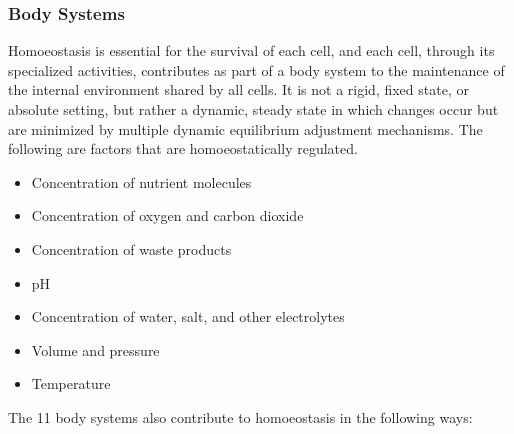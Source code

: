 \documentclass[11pt]{article}
\begin{document}
\subsubsection{Body Systems}
Homoeostasis is essential for the survival of each cell, and each cell, through its specialized activities, contributes as part of a body system to the maintenance of the internal environment shared by all cells. It is not a rigid, fixed state, or absolute setting, but rather a dynamic, steady state in which changes occur but are minimized by multiple dynamic equilibrium adjustment mechanisms. The following are factors that are homoeostatically regulated.
\begin{itemize}
\item Concentration of nutrient molecules 
\item Concentration of oxygen and carbon dioxide
\item Concentration of waste products
\item pH
\item Concentration of water, salt, and other electrolytes
\item Volume and pressure
\item Temperature
\end{itemize}
The 11 body systems also contribute to homoeostasis in the following ways:
\end{document}
